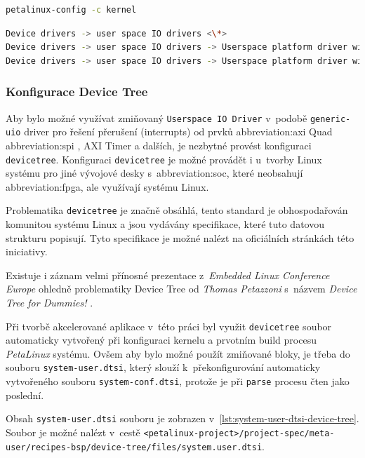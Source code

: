 \documentclass[a4paper, twoside, 11pt]{article}
\newcommand{\fbar}{\FloatBarrier}
\begin{document}
\begin{lstlisting}[language={sh}, caption={PetaLinux příkaz pro konfiguraci kernelu systému.}, label= {lst:petalinux-config-c-kernel}, morekeywords={petalinux-build, petalinux-package, petalinux-config}]
petalinux-config -c kernel\end{lstlisting}

\begin{lstlisting}[language={sh}, caption={PetaLinux konfigurace pro User Space IO Drivers.}, label= {lst:petalinux-config-c-kernel-userspace-io-driver}]
Device drivers -> user space IO drivers <\*>
Device drivers -> user space IO drivers -> Userspace platform driver with generic irq and dynamic memory <*>
Device drivers -> user space IO drivers -> Userspace platform driver with generic IRQ handling <*>\end{lstlisting}

		\fbar
		\subsubsection{Konfigurace Device Tree}\label{subsubsec:konfigurace-device-tree}
		Aby bylo možné využívat zmiňovaný \texttt{Userspace IO Driver} v~podobě \texttt{generic-uio} driver pro řešení přerušení (interrupts) od prvků \gls{abbreviation:axi} Quad \gls{abbreviation:spi} \cite{axi-quad-spi-ip-product-guide}, AXI Timer \cite{axi-timer-v-2-0-ip-product-guide} a dalších, je nezbytné provést konfiguraci \texttt{devicetree}. Konfiguraci \texttt{devicetree} je možné provádět i u~tvorby Linux systému pro jiné vývojové desky s~\gls{abbreviation:soc}, které neobsahují \gls{abbreviation:fpga}, ale využívají systému Linux.\par
		Problematika \texttt{devicetree} je značně obsáhlá, tento standard je obhospodařován komunitou systému Linux a jsou vydávány specifikace, které tuto datovou strukturu popisují. Tyto specifikace je možné nalézt na oficiálních stránkách této iniciativy. \cite{devicetree-org-specification}\par
		Existuje i záznam velmi přínosné prezentace z~\textit{Embedded Linux Conference Europe} ohledně problematiky Device Tree od \textit{Thomas Petazzoni} s~názvem \textit{Device Tree for Dummies!} \cite{youtube-devicetree-for-dummies}.\par
		Při tvorbě akcelerované aplikace v~této práci byl využit \texttt{devicetree} soubor automaticky vytvořený při konfiguraci kernelu a prvotním build procesu \textit{PetaLinux} systému. Ovšem aby bylo možné použít zmiňované bloky, je třeba do souboru \texttt{system-user.dtsi}, který slouží k~překonfigurování automaticky vytvořeného souboru \texttt{system-conf.dtsi}, protože je při \texttt{parse} procesu čten jako poslední.\par
		Obsah \texttt{system-user.dtsi} souboru je zobrazen v~\ref{lst:system-user-dtsi-device-tree}. Soubor je možné nalézt v~cestě \texttt{<petalinux-project>/project-spec/meta-user/recipes-bsp/device-tree/files/system.user.dtsi}.\par
\end{document}
